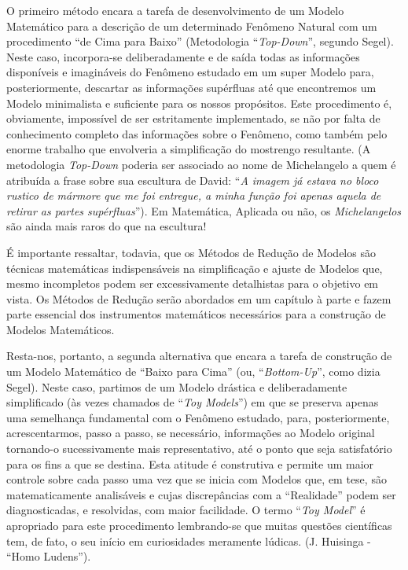     O primeiro método encara a tarefa de desenvolvimento de um Modelo Matemático para a descrição de um determinado Fenômeno Natural com um procedimento ``de Cima para Baixo'' (Metodologia ``\textit{Top-Down}'', segundo Segel). Neste caso, incorpora-se deliberadamente e de saída todas as informações disponíveis e imagináveis do Fenômeno estudado em um super Modelo para, posteriormente, descartar as informações supérfluas até que encontremos um Modelo minimalista e suficiente para os nossos propósitos. Este procedimento é, obviamente, impossível de ser estritamente implementado, se não por falta de conhecimento completo das informações sobre o Fenômeno, como também pelo enorme trabalho que envolveria a simplificação do mostrengo resultante. (A metodologia \textit{Top-Down} poderia ser associado ao nome de Michelangelo a quem é atribuída a frase sobre sua escultura de David: ``\textit{A imagem já estava no bloco rustico de mármore que me foi entregue, a minha função foi apenas aquela de retirar as partes supérfluas}''). Em Matemática, Aplicada ou não, os \textit{Michelangelos} são ainda mais raros do que na escultura!

    É importante ressaltar, todavia, que os Métodos de Redução de Modelos são técnicas matemáticas indispensáveis na simplificação e ajuste de Modelos que, mesmo incompletos podem ser excessivamente detalhistas para o objetivo em vista. Os Métodos de Redução serão abordados em um capítulo à parte e fazem parte essencial dos instrumentos matemáticos necessários para a construção de Modelos Matemáticos.

    Resta-nos, portanto, a segunda alternativa que encara a tarefa de construção de um Modelo Matemático de ``Baixo para Cima'' (ou, ``\textit{Bottom-Up}'', como dizia Segel). Neste caso, partimos de um Modelo drástica e deliberadamente simplificado (às vezes chamados de ``\textit{Toy Models}'') em que se preserva apenas uma semelhança fundamental com o Fenômeno estudado, para, posteriormente, acrescentarmos, passo a passo, se necessário, informações ao Modelo original tornando-o sucessivamente mais representativo, até o ponto que seja satisfatório para os fins a que se destina. Esta atitude é construtiva e permite um maior controle sobre cada passo uma vez que se inicia com Modelos que, em tese, são matematicamente analisáveis e cujas discrepâncias com a ``Realidade'' podem ser diagnosticadas, e resolvidas, com maior facilidade. O termo ``\textit{Toy Model}'' é apropriado para este procedimento lembrando-se que muitas questões científicas tem, de fato, o seu início em curiosidades meramente lúdicas. (J. Huisinga - ``Homo Ludens'').

